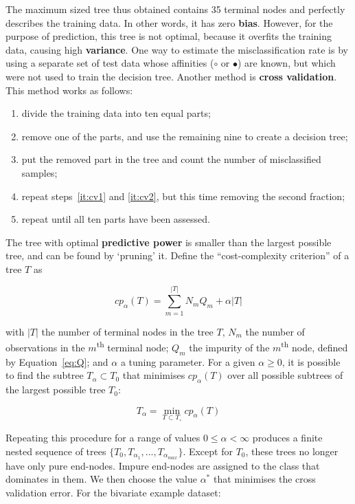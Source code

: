 The maximum sized tree thus obtained contains 35 terminal nodes and
perfectly describes the training data.  In other words, it has zero
\textbf{bias}.  However, for the purpose of prediction, this tree is
not optimal, because it overfits the training data, causing high
\textbf{variance}. One way to estimate the misclassification rate is
by using a separate set of test data whose affinities ($\circ$ or
$\bullet$) are known, but which were not used to train the decision
tree. Another method is \textbf{cross validation}. This method works
as follows:

\begin{enumerate}
\item divide the training data into ten equal parts;
\item\label{it:cv1} remove one of the parts, and use the remaining
  nine to create a decision tree;
\item\label{it:cv2} put the removed part in the tree and count the
  number of misclassified samples;
\item repeat steps~\ref{it:cv1} and \ref{it:cv2}, but this time
  removing the second fraction;
\item repeat until all ten parts have been assessed.
\end{enumerate}

The tree with optimal \textbf{predictive power} is smaller than the
largest possible tree, and can be found by `pruning' it. Define the
``cost-complexity criterion'' of a tree $T$ as

\begin{equation}
  \label{eq:cp}
  cp_{\alpha}(T) = \sum_{m=1}^{|T|} N_m Q_m + \alpha|T|
\end{equation}

with $|T|$ the number of terminal nodes in the tree $T$, $N_m$ the
number of observations in the $m$\textsuperscript{th} terminal node;
$Q_m$ the impurity of the $m$\textsuperscript{th} node, defined by
Equation~\ref{eq:Q}; and $\alpha$ a tuning parameter.  For a given
$\alpha \geq 0$, it is possible to find the subtree $T_{\alpha}
\subset T_0$ that minimises $cp_{\alpha}(T)$ over all possible
subtrees of the largest possible tree $T_0$:

\begin{equation}
  \label{eq:Ta}
  T_{\alpha} = \underset{T \subset T_\circ}{\min} cp_{\alpha}(T)
\end{equation}

Repeating this procedure for a range of values $0 \leq \alpha <
\infty$ produces a finite nested sequence of trees
$\{T_0,T_{\alpha_1},...,T_{\alpha_{max}}\}$.  Except for $T_0$, these
trees no longer have only pure end-nodes. Impure end-nodes are
assigned to the class that dominates in them.  We then choose the
value $\alpha^*$ that minimises the cross validation error. For the
bivariate example dataset:

